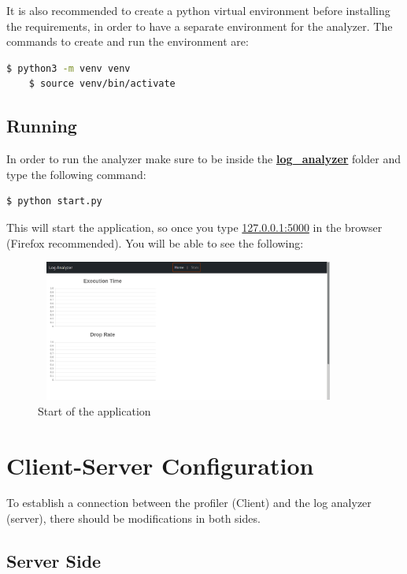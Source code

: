 It is also recommended to create a python virtual environment
before installing the requirements, in order to have a separate
environment for the analyzer. The commands to create and run the environment
are:
\newline
\begin{lstlisting}[language=bash, label={code:venv}, caption={Create virtual environment},captionpos=b]
	$ python3 -m venv venv	
	$ source venv/bin/activate
\end{lstlisting}


\subsection{Running} %
In order to run the analyzer make sure to be inside the
\textbf{\url{log_analyzer}} folder and type the following
command:
\newline
\begin{lstlisting}[language=bash, caption={Start application},captionpos=b]
	$ python start.py
\end{lstlisting}

This will start the application, so once you type \url{127.0.0.1:5000}
in the browser (Firefox recommended). You will be able to see the following:
\newline
\begin{figure}[H]
	\centering
	\includegraphics[width=0.9\textwidth,height=175px]{images/start.png}
	\caption{Start of the application}
	\label{fig:empty_page}
\end{figure}

\section{Client-Server Configuration} %
To establish a connection between the profiler (Client)
and the log analyzer (server), there should be modifications in both
sides.

\subsection{Server Side} \label{sec:server_side_config}

